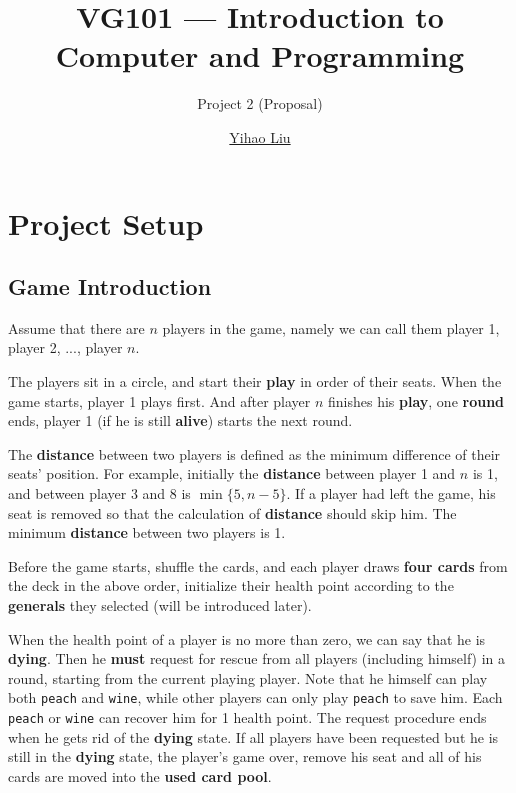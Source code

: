 \documentclass[11pt,a4paper]{article}
\title{VG101 --- Introduction to\\ Computer and Programming}
\subtitle{Project 2 (Proposal)}
\author{\href{mailto:liuyh615@sjtu.edu.cn}{Yihao Liu}}
\begin{document}
\maketitle

\section{Project Setup}

\subsection{Game Introduction}

Assume that there are $n$ players in the game, namely we can call them player 1, player 2, ..., player $n$. \bigskip

The players sit in a circle, and start their \textbf{play} in order of their seats. When the game starts, player 1 plays first. And after player $n$ finishes his \textbf{play}, one \textbf{round} ends, player 1 (if he is still \textbf{alive}) starts the next round. \bigskip

The \textbf{distance} between two players is defined as the minimum difference of their seats' position. For example, initially the \textbf{distance} between player 1 and $n$ is 1, and between player 3 and 8 is $\min\{5,n-5\}$. If a player had left the game, his seat is removed so that the calculation of \textbf{distance} should skip him. The minimum \textbf{distance} between two players is 1. \bigskip

Before the game starts, shuffle the cards, and each player draws \textbf{four cards} from the deck in the above order, initialize their health point according to the \textbf{generals} they selected (will be introduced later). \bigskip

When the health point of a player is no more than zero, we can say that he is \textbf{dying}. Then he \textbf{must} request for rescue from all players (including himself) in a round, starting from the current playing player. Note that he himself can play both \texttt{peach} and \texttt{wine}, while other players can only play \texttt{peach} to save him. Each \texttt{peach} or \texttt{wine} can recover him for 1 health point. The request procedure ends when he gets rid of the \textbf{dying} state. If all players have been requested but he is still in the \textbf{dying} state, the player's game over, remove his seat and all of his cards are moved into the \textbf{used card pool}. \bigskip
\end{document}
